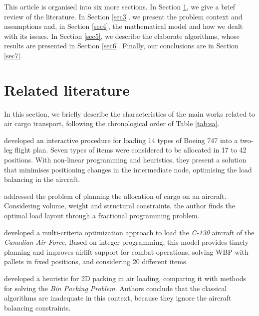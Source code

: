 \documentclass[preprint,authoryear]{elsarticle}
\begin{document}
This article is organised into six more sections. In Section \ref{sec2}, we give a brief review of the literature. In Section \ref{sec3}, we present the problem context and assumptions and, in Section \ref{sec4}, the mathematical model and how we dealt with its issues. In Section \ref{sec5}, we describe the elaborate algorithms, whose results are presented in Section \ref{sec6}. Finally, our conclusions are in Section \ref{sec7}.


\section{Related literature}
\label{sec2}

In this section, we briefly describe the characteristics of the main works related to air cargo transport, following the chronological order of Table \ref{tab:sa}.

\cite{LarsenMikkelsen1979} developed an interactive procedure for loading 14 types of Boeing 747 into a two-leg flight plan. Seven types of items were considered to be allocated in 17 to 42 positions. With non-linear programming and heuristics, they present a solution that minimises positioning changes in the intermediate node, optimising the load balancing in the aircraft.

\cite{Brosh1981} addressed the problem of planning the allocation of cargo on an aircraft. Considering volume, weight and structural constraints, the author finds the optimal load layout through a fractional programming problem.

\cite{Kevin1992} developed a multi-criteria optimization approach to load the {\it C-130} aircraft of the {\it Canadian Air Force}. Based on integer programming, this model provides timely planning and improves airlift support for combat operations, solving WBP with pallets in fixed positions, and considering 20 different items.

\cite{Heidelberg1998} developed a heuristic for 2D packing in air loading, comparing it with methods for solving the {\it Bin Packing Problem}. Authors conclude that the classical algorithms are inadequate in this context, because they ignore the aircraft balancing constraints.

\end{document}
